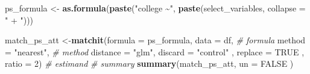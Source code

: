 \documentclass[
]{article}
\newenvironment{Shaded}{\begin{snugshade}}{\end{snugshade}}
\newcommand{\AttributeTok}[1]{\textcolor[rgb]{0.13,0.29,0.53}{#1}}
\newcommand{\CommentTok}[1]{\textcolor[rgb]{0.56,0.35,0.01}{\textit{#1}}}
\newcommand{\ConstantTok}[1]{\textcolor[rgb]{0.56,0.35,0.01}{#1}}
\newcommand{\DecValTok}[1]{\textcolor[rgb]{0.00,0.00,0.81}{#1}}
\newcommand{\FunctionTok}[1]{\textcolor[rgb]{0.13,0.29,0.53}{\textbf{#1}}}
\newcommand{\NormalTok}[1]{#1}
\newcommand{\OtherTok}[1]{\textcolor[rgb]{0.56,0.35,0.01}{#1}}
\newcommand{\StringTok}[1]{\textcolor[rgb]{0.31,0.60,0.02}{#1}}
\begin{document}
\begin{Shaded}
\begin{Highlighting}[]
\NormalTok{ps\_formula }\OtherTok{\textless{}{-}} \FunctionTok{as.formula}\NormalTok{(}\FunctionTok{paste}\NormalTok{(}\StringTok{"college \textasciitilde{}"}\NormalTok{, }\FunctionTok{paste}\NormalTok{(select\_variables, }\AttributeTok{collapse =} \StringTok{" + "}\NormalTok{)))}

\NormalTok{match\_ps\_att }\OtherTok{\textless{}{-}}\FunctionTok{matchit}\NormalTok{(}\AttributeTok{formula =}\NormalTok{ ps\_formula, }\AttributeTok{data =}\NormalTok{ df,  }\CommentTok{\# formula}
                          \AttributeTok{method =} \StringTok{"nearest"}\NormalTok{, }\CommentTok{\# method}
                          \AttributeTok{distance =} \StringTok{"glm"}\NormalTok{, }
                          \AttributeTok{discard =} \StringTok{"control"}\NormalTok{ ,}
                          \AttributeTok{replace =} \ConstantTok{TRUE}\NormalTok{ , }
                         \AttributeTok{ratio =} \DecValTok{2}\NormalTok{) }\CommentTok{\# estimand}
\CommentTok{\# summary}
\FunctionTok{summary}\NormalTok{(match\_ps\_att, }\AttributeTok{un =} \ConstantTok{FALSE}\NormalTok{ )}
\end{Highlighting}
\end{Shaded}
\end{document}
